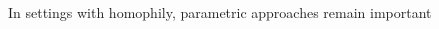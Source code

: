 \documentclass[aspectratio=169]{beamer}
\theoremstyle{remark}
\begin{document}
\begin{frame}{In settings with homophily, parametric approaches remain important}
    \vspace{4mm}
    \begin{columns}
        \begin{column}{0.49\paperwidth}
        \end{column}
        \begin{column}{0.49\paperwidth}
\end{column}
\end{columns}
\end{frame}
\end{document}
